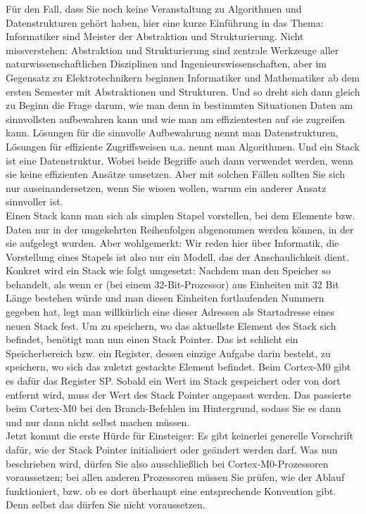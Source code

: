 Für den Fall, dass Sie noch keine Veranstaltung zu Algorithmen und Datenstrukturen gehört haben, hier eine kurze Einführung in das Thema: Informatiker sind Meister der Abstraktion und Strukturierung. Nicht missverstehen: Abstraktion und Strukturierung sind zentrale Werkzeuge aller naturwissenschaftlichen Disziplinen und Ingenieurswissenschaften, aber im Gegensatz zu Elektrotechnikern beginnen Informatiker und Mathematiker ab dem ersten Semester mit Abstraktionen und Strukturen. Und so dreht sich dann gleich zu Beginn die Frage darum, wie man denn in bestimmten Situationen Daten am sinnvollsten aufbewahren kann und wie man am effizientesten auf sie zugreifen kann. Lösungen für die sinnvolle Aufbewahrung nennt man Datenstrukturen, Lösungen für effiziente Zugriffsweisen u.a. nennt man Algorithmen. Und ein Stack ist eine Datenstruktur. Wobei beide Begriffe auch dann verwendet werden, wenn sie keine effizienten Ansätze umsetzen. Aber mit solchen Fällen sollten Sie sich nur auseinandersetzen, wenn Sie wissen wollen, warum ein anderer Ansatz sinnvoller ist.\\

Einen Stack kann man sich als simplen Stapel vorstellen, bei dem Elemente bzw. Daten nur in der umgekehrten Reihenfolgen abgenommen werden können, in der sie aufgelegt wurden. Aber wohlgemerkt: Wir reden hier über Informatik, die Vorstellung eines Stapels ist also nur ein Modell, das der Anschaulichkeit dient.\\

Konkret wird ein Stack wie folgt umgesetzt: Nachdem man den Speicher so behandelt, als wenn er (bei einem 32-Bit-Prozessor) aus Einheiten mit 32 Bit Länge bestehen würde und man diesen Einheiten fortlaufenden Nummern gegeben hat, legt man willkürlich eine dieser Adressen als Startadresse eines neuen Stack fest. Um zu speichern, wo das aktuellste Element des Stack sich befindet, benötigt man nun einen Stack Pointer. Das ist schlicht ein Speicherbereich bzw. ein Register, dessen einzige Aufgabe darin besteht, zu speichern, wo sich das zuletzt gestackte Element befindet. Beim Cortex-M0 gibt es dafür das Register SP. Sobald ein Wert im Stack gespeichert oder von dort entfernt wird, muss der Wert des Stack Pointer angepasst werden. Das passierte beim Cortex-M0 bei den Branch-Befehlen im Hintergrund, sodass Sie es dann und nur dann nicht selbst machen müssen.\\

Jetzt kommt die erste Hürde für Einsteiger: Es gibt keinerlei generelle Vorschrift dafür, wie der Stack Pointer initialisiert oder geändert werden darf. Was nun beschrieben wird, dürfen Sie also ausschließlich bei Cortex-M0-Prozessoren voraussetzen; bei allen anderen Prozessoren müssen Sie prüfen, wie der Ablauf funktioniert, bzw. ob es dort überhaupt eine entsprechende Konvention gibt. Denn selbst das dürfen Sie nicht voraussetzen.\\

